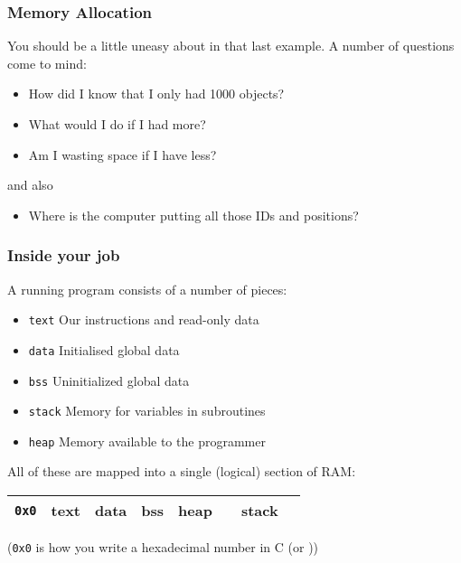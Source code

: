 \documentclass[10pt, t]{beamer}
\begin{document}
\begin{frame}
\frametitle{Memory Allocation}
\label{sec-5_1_3}

You should be a little uneasy about  in that last example.  A number of questions come to mind:

\begin{itemize}
\item How did I know that I only had 1000 objects?
\item What would I do if I had more?
\item Am I wasting space if I have less?
\end{itemize}
\pause
and also

\begin{itemize}
\item Where is the computer putting all those IDs and positions?
\end{itemize}
\end{frame}
\begin{frame}
\frametitle{Inside your job}
\label{sec-5_1_4}

A running program consists of a number of pieces:

\begin{itemize}
\item \pause \texttt{text}  Our instructions and read-only data
\item \pause \texttt{data}  Initialised global data
\end{itemize}

\begin{itemize}
\item \pause \texttt{bss}   Uninitialized global data
\item \pause \texttt{stack} Memory for variables in subroutines
\item \pause \texttt{heap}  Memory available to the programmer
\end{itemize}

\pause
All of these are mapped into a single (logical) section of RAM:


\begin{center}
\begin{tabular}{|*{8}{l|}}
\hline
 \texttt{0x0}  &  text  &  data  &  bss  &  heap  &  \hspace{1cm}  &  stack  \\
\hline
\end{tabular}
\end{center}



(\texttt{0x0} is how you write a hexadecimal number in C (or \CPP))
\end{frame}
\end{document}
